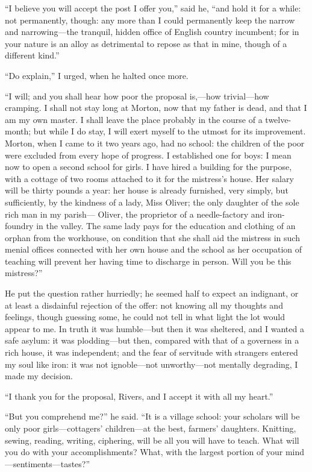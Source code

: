 \enquote{I believe you will accept the post I offer you,} said he,
\enquote{and hold it for a while: not permanently, though: any more than
I could permanently keep the narrow and narrowing---the tranquil, hidden
office of English country incumbent; for in your nature is an alloy as
detrimental to repose as that in mine, though of a different kind.}

\enquote{Do explain,} I urged, when he halted once more.

\enquote{I will; and you shall hear how poor the proposal is,---how
trivial---how cramping. I shall not stay long at Morton, now that my
father is dead, and that I am my own master. I shall leave the place
probably in the course of a twelve-month; but while I do stay, I will
exert myself to the utmost for its improvement. Morton, when I came to
it two years ago, had no school: the children of the poor were excluded
from every hope of progress. I established one for boys: I mean now to
open a second school for girls. I have hired a building for the
purpose, with a cottage of two rooms attached to it for the mistress's
house. Her salary will be thirty pounds a year: her house is already
furnished, very simply, but sufficiently, by the kindness of a lady,
Miss Oliver; the only daughter of the sole rich man in my parish---\Mr{}
Oliver, the proprietor of a needle-factory and iron-foundry in the
valley. The same lady pays for the education and clothing of an orphan
from the workhouse, on condition that she shall aid the mistress in such
menial offices connected with her own house and the school as her
occupation of teaching will prevent her having time to discharge in
person. Will you be this mistress?}

He put the question rather hurriedly; he seemed half to expect an
indignant, or at least a disdainful rejection of the offer: not knowing
all my thoughts and feelings, though guessing some, he could not tell in
what light the lot would appear to me. In truth it was humble---but
then it was sheltered, and I wanted a safe asylum: it was plodding---but
then, compared with that of a governess in a rich house, it was
independent; and the fear of servitude with strangers entered my soul
like iron: it was not ignoble---not unworthy---not mentally degrading, I
made my decision.

\enquote{I thank you for the proposal, \Mr{} Rivers, and I accept it with
all my heart.}

\enquote{But you comprehend me?} he said. \enquote{It is a village
school: your scholars will be only poor girls---cottagers' children---at
the best, farmers' daughters. Knitting, sewing, reading, writing,
ciphering, will be all you will have to teach. What will you do with
your accomplishments? What, with the largest portion of your
mind---sentiments---tastes?}

